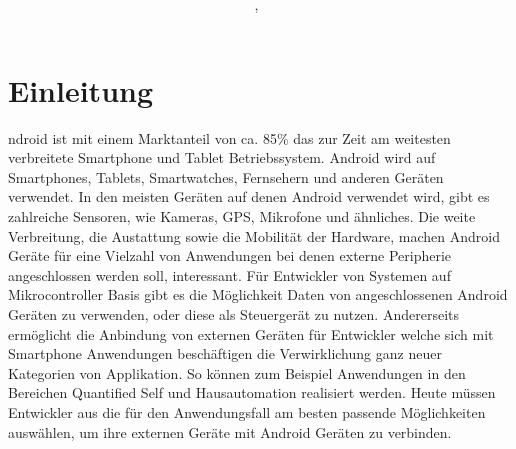 \documentclass[12pt,journal,compsoc]{IEEEtran}
\begin{document}
\title{\paperTitle \\ \paperSubTitle }
\author{\paperAuthor,~}%



\maketitle

\section{Einleitung}


ndroid ist mit einem Marktanteil von ca. 85\% das zur Zeit am weitesten verbreitete Smartphone und Tablet Betriebssystem.\cite{marketshare}
Android wird auf Smartphones, Tablets, Smartwatches, Fernsehern und anderen Geräten verwendet.
In den meisten Geräten auf denen Android verwendet wird, gibt es zahlreiche Sensoren, wie Kameras, GPS, Mikrofone und ähnliches.
Die weite Verbreitung, die Austattung sowie die Mobilität der Hardware, machen Android Geräte für eine Vielzahl von Anwendungen bei denen externe Peripherie angeschlossen werden soll, interessant.
Für Entwickler von Systemen auf Mikrocontroller Basis gibt es die Möglichkeit Daten von angeschlossenen Android Geräten zu verwenden, oder diese als Steuergerät zu nutzen.
Andererseits ermöglicht die Anbindung von externen Geräten für Entwickler welche sich mit Smartphone Anwendungen beschäftigen die Verwirklichung ganz neuer Kategorien von Applikation. 
So können zum Beispiel Anwendungen in den Bereichen Quantified Self und Hausautomation realisiert werden. 
Heute müssen Entwickler aus die für den Anwendungsfall am besten passende Möglichkeiten auswählen, um ihre externen Geräte mit Android Geräten zu verbinden.
\end{document}
